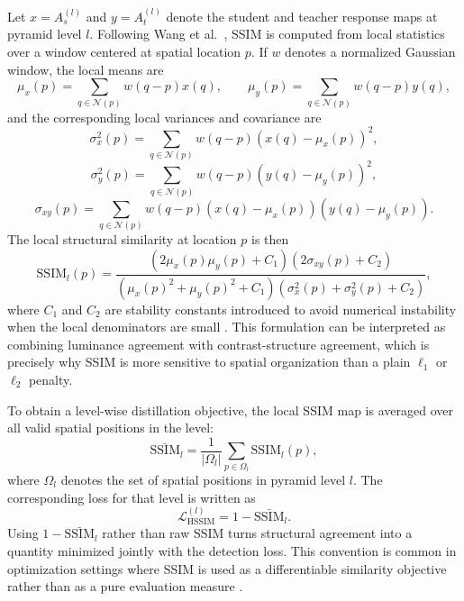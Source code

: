 Let $x=A_s^{(l)}$ and $y=A_t^{(l)}$ denote the student and teacher response maps at pyramid level $l$. Following Wang et al.\ \cite{wang2004ssim}, SSIM is computed from local statistics over a window centered at spatial location $p$. If $w$ denotes a normalized Gaussian window, the local means are
\begin{equation}
\mu_x(p) = \sum_{q \in \mathcal{N}(p)} w(q-p)x(q), \qquad
\mu_y(p) = \sum_{q \in \mathcal{N}(p)} w(q-p)y(q),
\end{equation}
and the corresponding local variances and covariance are
\begin{equation}
\sigma_x^2(p) = \sum_{q \in \mathcal{N}(p)} w(q-p)\left(x(q)-\mu_x(p)\right)^2,
\end{equation}
\begin{equation}
\sigma_y^2(p) = \sum_{q \in \mathcal{N}(p)} w(q-p)\left(y(q)-\mu_y(p)\right)^2,
\end{equation}
\begin{equation}
\sigma_{xy}(p) = \sum_{q \in \mathcal{N}(p)} w(q-p)\left(x(q)-\mu_x(p)\right)\left(y(q)-\mu_y(p)\right).
\end{equation}
The local structural similarity at location $p$ is then
\begin{equation}
\mathrm{SSIM}_l(p)=
\frac{\left(2\mu_x(p)\mu_y(p)+C_1\right)\left(2\sigma_{xy}(p)+C_2\right)}
{\left(\mu_x(p)^2+\mu_y(p)^2+C_1\right)\left(\sigma_x^2(p)+\sigma_y^2(p)+C_2\right)},
\end{equation}
where $C_1$ and $C_2$ are stability constants introduced to avoid numerical instability when the local denominators are small \cite{wang2004ssim}. This formulation can be interpreted as combining luminance agreement with contrast-structure agreement, which is precisely why SSIM is more sensitive to spatial organization than a plain $\ell_1$ or $\ell_2$ penalty.

To obtain a level-wise distillation objective, the local SSIM map is averaged over all valid spatial positions in the level:
\begin{equation}
\bar{\mathrm{SSIM}}_l = \frac{1}{|\Omega_l|}\sum_{p \in \Omega_l}\mathrm{SSIM}_l(p),
\end{equation}
where $\Omega_l$ denotes the set of spatial positions in pyramid level $l$. The corresponding loss for that level is written as
\begin{equation}
\mathcal{L}_{\mathrm{HSSIM}}^{(l)} = 1 - \bar{\mathrm{SSIM}}_l.
\end{equation}
Using $1-\bar{\mathrm{SSIM}}_l$ rather than raw SSIM turns structural agreement into a quantity minimized jointly with the detection loss. This convention is common in optimization settings where SSIM is used as a differentiable similarity objective rather than as a pure evaluation measure \cite{wang2004ssim,nilsson2020understandssim,venkataramanan2021ssimguide}.

